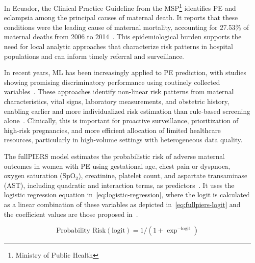 \documentclass[diagnostics,article,submit,pdftex,moreauthors]{Definitions/mdpi}
\begin{document}
In Ecuador, the Clinical Practice Guideline from the \ac{MSP}\footnote{ Ministry of Public Health} identifies
\ac{PE} and eclampsia among the principal causes of maternal
death. It reports that these conditions were the leading cause of
maternal mortality, accounting for 27.53\% of maternal deaths from
2006 to 2014~\cite{msp_ecuador_hdp_2013}. This epidemiological burden
supports the need for local analytic approaches that characterize risk
patterns in hospital populations and can inform timely referral and
surveillance.

In recent years, \ac{ML} has been increasingly applied to \ac{PE}
prediction, with studies showing promising discriminatory performance
using routinely collected variables~\cite{LI2021102,mennickent_2023,Darsareh2024,Rahman2023}.
These approaches identify non-linear risk patterns from maternal
characteristics, vital signs, laboratory measurements, and obstetric
history, enabling earlier and more individualized risk estimation than
rule-based screening alone~\cite{LI2021102,mennickent_2023}. Clinically,
this is important for proactive surveillance, prioritization of
high-risk pregnancies, and more efficient allocation of limited
healthcare resources, particularly in high-volume settings with
heterogeneous data quality.

The full\ac{PIERS} model estimates the probabilistic
risk of adverse maternal outcomes in women with \ac{PE} using
gestational age, chest pain or dyspnoea, oxygen saturation
(SpO$_2$), creatinine, platelet count, and aspartate transaminase
(\ac{AST}), including quadratic and interaction terms, as
predictors~\cite{fullpiers_2011}. It uses the logistic regression
equation in~\eqref{eq:logistic-regression}, where the logit is
calculated as a linear combination of these variables as depicted
in~\eqref{eq:fullpiers-logit} and the coefficient values are those
proposed in~\cite{fullpiers_2011}.

\begin{linenomath}
\begin{equation}
  \text{Probability Risk}(\text{logit})=1/(1+\exp^{-\text{logit}})
  \label{eq:logistic-regression}
\end{equation}
\end{linenomath}
\end{document}
